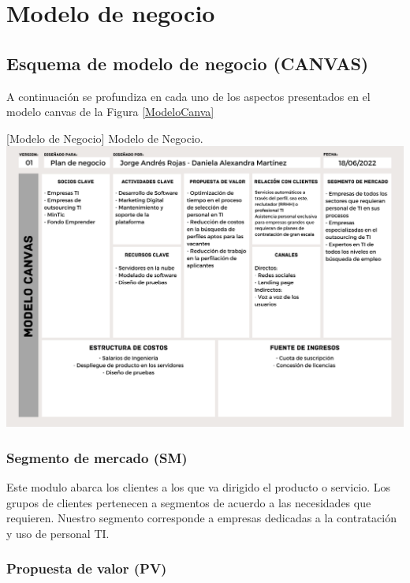 \section{Modelo de negocio}
\subsection{Esquema de modelo de negocio (CANVAS)}

A continuación se profundiza en cada uno de los aspectos presentados en el modelo canvas de la Figura \ref{ModeloCanva}


\vspace{2mm}
        \begin{minipage}{0.9\textwidth}
        \centering
        [{Modelo de Negocio}]{ Modelo de Negocio.}
        \label{ModeloCanva}
         \includegraphics[width=\textwidth]{Images/modelocanva}
\end{minipage}
        
\subsubsection*{Segmento de mercado (SM)}


Este modulo abarca los clientes a los que va dirigido el producto o servicio. Los grupos de clientes pertenecen a segmentos de acuerdo a las necesidades que requieren. Nuestro segmento corresponde a empresas dedicadas a la contratación y uso de personal TI. 

\subsubsection*{Propuesta de valor (PV)}


